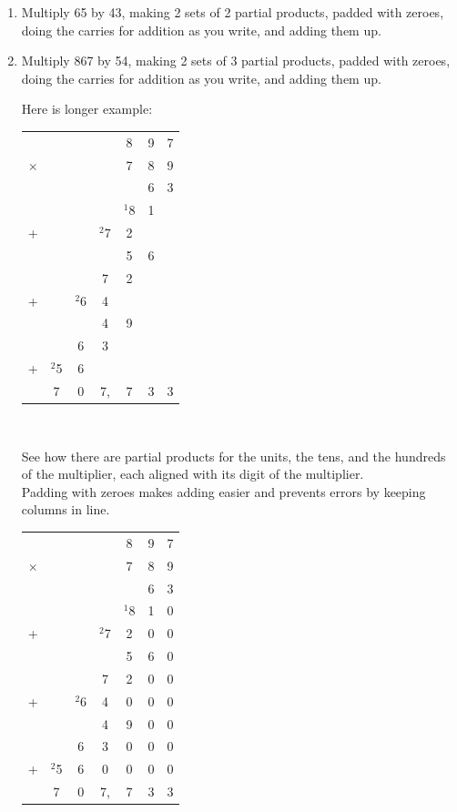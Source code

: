 \documentclass[12pt]{article}
\begin{document}
\begin{enumerate}
\item Multiply 65 by 43, making 2 sets of 2 partial products, padded with zeroes, doing the carries for addition as you write, and adding them up.
\item Multiply 867 by 54, making 2 sets of 3 partial products, padded with zeroes, doing the carries for addition as you write, and adding them up.

\newpage

Here is longer example:

\begin{center}
\begin{tabular}{c@{\,}c@{\,}c@{\,}c@{\,}c@{\,}c@{\,}c}
       & & & &8&9&7\\
$\times$ & & & &7&8&9\\
\hline
       & & & & &6&3\\
   & & & &$^{1}$8&1& \\
  +& & &$^{2}$7&2& & \\
\hline
       & & & &5&6& \\
       & & &7&2& & \\
  +& & $^{2}$6&4& & & \\
\hline
       & & &4&9& & \\
       & &6&3& & & \\
  +&$^{2}$5&6& & & & \\
\hline
      &7&0&7,&7&3&3 \\
\hline
\hline
\end{tabular}\\
\end{center}

\vspace{32pt}
See how there are partial products for the units, the tens, and the hundreds of the multiplier, each aligned with its digit of the multiplier.\\

Padding with zeroes makes adding easier and prevents errors by keeping columns in line.

\begin{center}
\begin{tabular}{c@{\,}c@{\,}c@{\,}c@{\,}c@{\,}c@{\,}c}
       & & & &8&9&7\\
$\times$ & & & &7&8&9\\
\hline
       & & & & &6&3\\
   & & & &$^{1}$8&1&0\\
  +& & &$^{2}$7&2&0&0\\
\hline
       & & & &5&6&0\\
       & & &7&2&0&0\\
  +& & $^{2}$6&4&0&0&0\\
\hline
       & & &4&9&0&0\\
       & &6&3&0&0&0\\
  +&$^{2}$5&6&0&0&0&0\\
\hline
      &7&0&7,&7&3&3\\
\hline
\hline
\end{tabular}\\
\end{center}


\end{enumerate}
\end{document}
